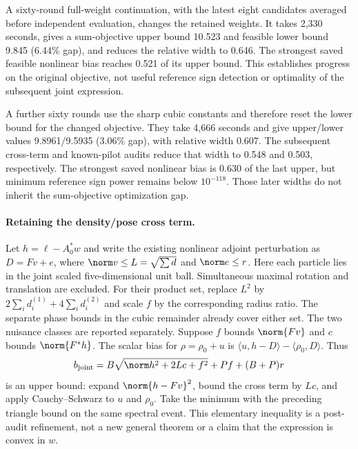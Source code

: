 A sixty-round full-weight continuation, with the latest eight candidates
averaged before independent evaluation, changes the retained weights. It takes
2,330 seconds, gives a sum-objective upper bound 10.523 and feasible lower
bound 9.845 (6.44\% gap), and reduces the relative width to 0.646. The
strongest saved feasible nonlinear bias reaches 0.521 of its upper bound.
This establishes progress on the original objective, not useful reference
sign detection or optimality of the subsequent joint expression.

A further sixty rounds use the sharp cubic constants and therefore reset
the lower bound for the changed objective. They take 4,666 seconds and give
upper/lower values 9.8961/9.5935 (3.06\% gap), with relative width 0.607.
The subsequent cross-term and known-pilot audits reduce that width to 0.548
and 0.503, respectively. The strongest saved nonlinear bias is 0.630 of the
last upper, but minimum reference sign power remains below $10^{-118}$.
Those later widths do not inherit the sum-objective optimization gap.

\paragraph{Retaining the density/pose cross term.}
Let $h=\ell-A_0^*w$ and write the existing nonlinear adjoint perturbation as
$D=Fv+e$, where $\norm v\le L=\sqrt{\sum d}$ and $\norm e\le r$.
Here each particle lies in the joint scaled five-dimensional unit ball.
Simultaneous maximal rotation and translation are excluded. For their product
set, replace $L^2$ by $2\sum_i d_i^{(1)}+4\sum_i d_i^{(2)}$ and scale $f$
by the corresponding radius ratio. The separate phase bounds in the cubic
remainder already cover either set. The two nuisance classes are reported
separately.
Suppose $f$ bounds $\norm{Fv}$ and $c$ bounds $\norm{F^*h}$.
The scalar bias for $\rho=\rho_0+u$ is
$\langle u,h-D\rangle-\langle\rho_0,D\rangle$. Thus
\begin{equation}
 b_{\rm joint}=B\sqrt{\norm h^2+2Lc+f^2}+Pf+(B+P)r
 \label{eq:joint-cross-bias}
\end{equation}
is an upper bound: expand $\norm{h-Fv}^2$, bound the cross term by $Lc$,
and apply Cauchy--Schwarz to $u$ and $\rho_0$. Take the minimum with the
preceding triangle bound on the same spectral event. This elementary
inequality is a post-audit refinement, not a new general theorem or a
claim that the expression is convex in $w$.

